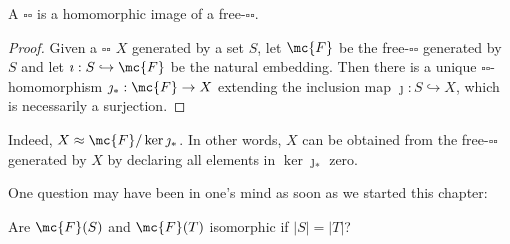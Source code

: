 \begin{prop}
    A $\square\square$ is a homomorphic image of a free-$\square\square$.
\end{prop}
\begin{proof}
    Given a $\square\square$ $X$ generated by a set $S$, let $\mc{F}$ be the free-$\square\square$ generated by $S$ and let $\imath: S\hookrightarrow\mc{F}$ be the natural embedding.
    Then there is a unique $\square\square$-homomorphism $\jmath_*: \mc{F}\rightarrow X$ extending the inclusion map $\jmath: S\hookrightarrow X$, which is necessarily a surjection.
\end{proof}
\begin{rmk}
    Indeed, $X\approx\mc{F}/\ker{\jmath_*}$.
    In other words, $X$ can be obtained from the free-$\square\square$ generated by $X$ by declaring all elements in $\ker{\jmath_*}$ zero.
\end{rmk}

One question may have been in one's mind as soon as we started this chapter:
\begin{center}
    Are $\mc{F}(S)$ and $\mc{F}(T)$ isomorphic if $|S|=|T|$?
\end{center}

